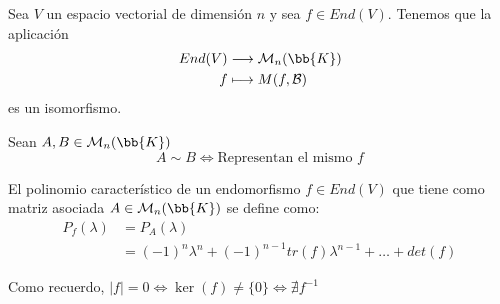 \begin{teo}
    Sea $V$ un espacio vectorial de dimensión $n$ y sea $f \in End(V)$. Tenemos que la aplicación
    \begin{align*}
        End(V) & \longrightarrow \mathcal{M}_n(\bb{K}) \\
        f & \longmapsto M(f, \mathcal{B})
    \end{align*}
    es un isomorfismo.
\end{teo}

\begin{prop}
    Sean $A,B\in\mathcal{M}_n(\bb{K})$
    \begin{equation*}
        A \sim B \Longleftrightarrow \text{Representan el mismo $f$}
    \end{equation*}
\end{prop}
\begin{definicion}
    El polinomio característico de un endomorfismo $f\in End(V)$ que tiene como matriz asociada $A \in \mathcal{M}_n(\bb{K})$ se define como:
    \begin{equation*}\begin{split}
        P_f(\lambda) & = P_A(\lambda) \\
        & = (-1)^n\lambda ^n + (-1)^{n-1}tr(f)\lambda ^{n-1} + \dots + det(f)
    \end{split}\end{equation*}
\end{definicion}
\begin{observacion}
    Como recuerdo, $|f|=0\Longleftrightarrow \ker(f)\neq \{0\} \Longleftrightarrow \nexists f^{-1} $
\end{observacion}

